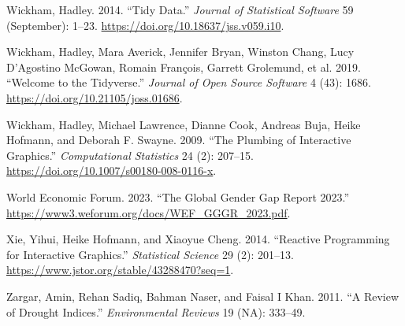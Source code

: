 \documentclass[
]{interact}
\newlength{\cslhangindent}
\newlength{\cslentryspacingunit} %
\newenvironment{CSLReferences}[2] %
 {%
  \setlength{\parindent}{0pt}
  \ifodd #1
  \let\oldpar\par
  \def\par{\hangindent=\cslhangindent\oldpar}
  \fi
  \setlength{\parskip}{#2\cslentryspacingunit}
 }%
 {}
\begin{document}
\begin{CSLReferences}{1}{0}
\leavevmode{}%
Wickham, Hadley. 2014. {``Tidy {Data}.''} \emph{Journal of Statistical
Software} 59 (September): 1--23.
\url{https://doi.org/10.18637/jss.v059.i10}.

\leavevmode{}%
Wickham, Hadley, Mara Averick, Jennifer Bryan, Winston Chang, Lucy
D'Agostino McGowan, Romain François, Garrett Grolemund, et al. 2019.
{``Welcome to the {Tidyverse}.''} \emph{Journal of Open Source Software}
4 (43): 1686. \url{https://doi.org/10.21105/joss.01686}.

\leavevmode{}%
Wickham, Hadley, Michael Lawrence, Dianne Cook, Andreas Buja, Heike
Hofmann, and Deborah F. Swayne. 2009. {``The Plumbing of Interactive
Graphics.''} \emph{Computational Statistics} 24 (2): 207--15.
\url{https://doi.org/10.1007/s00180-008-0116-x}.

\leavevmode{}%
World Economic Forum. 2023. {``{The Global Gender Gap Report 2023}.''}
\url{https://www3.weforum.org/docs/WEF_GGGR_2023.pdf}.

\leavevmode{}%
Xie, Yihui, Heike Hofmann, and Xiaoyue Cheng. 2014. {``Reactive
{Programming} for {Interactive} {Graphics}.''} \emph{Statistical
Science} 29 (2): 201--13.
\url{https://www.jstor.org/stable/43288470?seq=1}.

\leavevmode{}%
Zargar, Amin, Rehan Sadiq, Bahman Naser, and Faisal I Khan. 2011. {``A
Review of Drought Indices.''} \emph{Environmental Reviews} 19 (NA):
333--49.

\end{CSLReferences}
\end{document}
